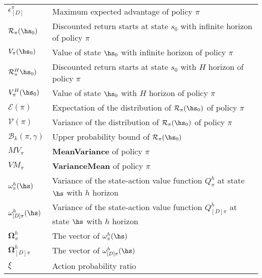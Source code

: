 \begin{table}[H]
\begin{tabular}{p{2cm} p{13cm}}
        $\epsilon_{[D]}^{\pi}$ & Maximum expected advantage of policy $\pi$\\
        ${\mathcal{R}}_\pi(\hs_0)$ & Discounted return starts at state $s_0$ with infinite horizon of policy $\pi$\\
        $V_\pi(\hs_0)$ & Value of state $\hs_0$ with infinite horizon of policy $\pi$\\
        ${\mathcal{R}}_\pi^H\hs_0)$ & Discounted return starts at state $s_0$ with $H$ horizon of policy $\pi$\\
        $V_\pi^H(\hs_0)$ & Value of state $\hs_0$ with $H$ horizon of policy $\pi$\\
        $\mathcal{E}(\pi)$ & Expectation of the distribution of  ${\mathcal{R}}_\pi(\hs_0)$ of policy $\pi$\\
        $\mathcal{V}(\pi)$ & Variance of the distribution of  ${\mathcal{R}}_\pi(\hs_0)$ of policy $\pi$\\
        $\mathcal{B}_{k}(\pi, \gamma)$ & Upper probability bound of ${\mathcal{R}}_\pi(\hs_0)$\\
        $MV_\pi$ & \textbf{MeanVariance} of policy ${\pi}$\\
        $VM_\pi$ & \textbf{VarianceMean} of policy ${\pi}$\\
        $\omega_\pi^h(\hs)$ & Variance of the state-action value function ${Q^h_\pi}$ at state ${\hs}$ with $h$ horizon\\
        $\omega_{[D]\pi}^h(\hs)$ & Variance of the state-action value function $Q^h_{[D]\pi}$ at state ${\hs}$ with $h$ horizon\\
        $\bm \Omega_\pi^h$ & The vector of $\omega_\pi^h(\hs)$\\
        $\bm \Omega_{[D]\pi}^{h}$ & The vector of $\omega_{[D]\pi}^h(\hs)$\\
        $\xi$ & Action probability ratio\\
        
        \bottomrule
    \end{tabular}
\end{table}